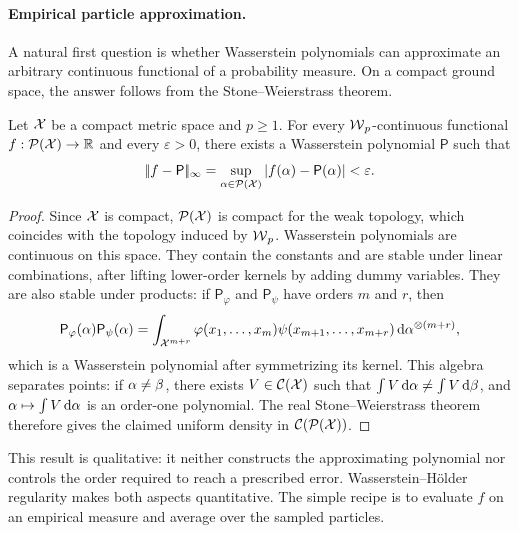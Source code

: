 \paragraph{Empirical particle approximation.}

A natural first question is whether Wasserstein polynomials can approximate an arbitrary continuous functional of a probability measure. On a compact ground space, the answer follows from the Stone--Weierstrass theorem.

\begin{prop}\label{prop-density-wasserstein-polynomials}
	Let \(\mathcal{X}\) be a compact metric space and \(p\geq1\). For every \(\operatorname{\mathcal{W}}_p\)-continuous functional \(f:\mathcal{P}(\mathcal{X})\to\mathbb{R}\) and every \(\varepsilon>0\), there exists a Wasserstein polynomial \(\mathsf P\) such that
	\[
		|\!| f-\mathsf P |\!|_{\infty}
		=
		\sup_{\alpha\in\mathcal{P}(\mathcal{X})}|f(\alpha)-\mathsf P(\alpha)|
		<\varepsilon.
	\]
\end{prop}
\begin{proof}
	Since \(\mathcal{X}\) is compact, \(\mathcal{P}(\mathcal{X})\) is compact for the weak topology, which coincides with the topology induced by \(\operatorname{\mathcal{W}}_p\). Wasserstein polynomials are continuous on this space. They contain the constants and are stable under linear combinations, after lifting lower-order kernels by adding dummy variables. They are also stable under products: if \(\mathsf P_\varphi\) and \(\mathsf P_\psi\) have orders \(m\) and \(r\), then
	\[
		\mathsf P_\varphi(\alpha)\mathsf P_\psi(\alpha)
		=
		\int_{\mathcal{X}^{m+r}}
		\varphi(x_1,\ldots,x_m)\psi(x_{m+1},\ldots,x_{m+r})
		\,\mathrm{d}\alpha^{\otimes(m+r)},
	\]
	which is a Wasserstein polynomial after symmetrizing its kernel. This algebra separates points: if \(\alpha\neq\beta\), there exists \(V\in\mathcal C(\mathcal{X})\) such that \(\int V\,\mathrm{d}\alpha\neq\int V\,\mathrm{d}\beta\), and \(\alpha\mapsto\int V\,\mathrm{d}\alpha\) is an order-one polynomial. The real Stone--Weierstrass theorem therefore gives the claimed uniform density in \(\mathcal C(\mathcal{P}(\mathcal{X}))\).
\end{proof}

This result is qualitative: it neither constructs the approximating polynomial nor controls the order required to reach a prescribed error. Wasserstein--H\"older regularity makes both aspects quantitative. The simple recipe is to evaluate \(f\) on an empirical measure and average over the sampled particles.

